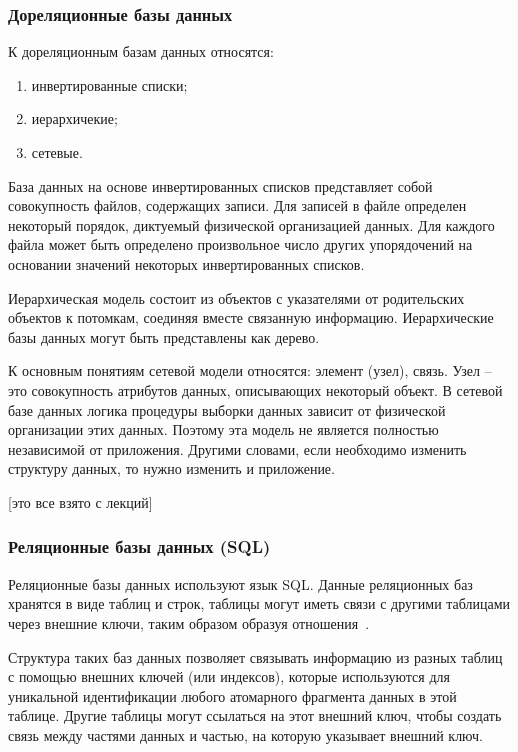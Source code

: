 \subsubsection{Дореляционные базы данных}

К дореляционным базам данных относятся:

\begin{enumerate}[label*=---]
	\item инвертированные списки;
	\item иерархичекие;
	\item сетевые.
\end{enumerate}

База данных на основе инвертированных списков представляет собой совокупность файлов, содержащих записи. Для записей в файле определен некоторый порядок, диктуемый физической организацией данных. Для каждого файла может быть определено произвольное число других упорядочений на основании значений некоторых инвертированных списков. 

Иерархическая модель  состоит из объектов с указателями от родительских объектов к потомкам, соединяя вместе связанную информацию. Иерархические базы данных могут быть представлены как дерево.

К основным понятиям сетевой модели относятся: элемент (узел), связь. Узел -- это совокупность атрибутов данных, описывающих некоторый объект. В сетевой базе данных логика процедуры выборки данных зависит от физической организации этих данных. Поэтому эта модель не является полностью независимой от приложения. Другими словами, если необходимо изменить структуру данных, то нужно изменить и приложение.


[это все взято с лекций]

\subsubsection{Реляционные базы данных (SQL)}

Реляционные базы данных используют язык SQL. Данные реляционных баз хранятся в виде таблиц и строк, таблицы могут иметь связи с другими таблицами через внешние ключи, таким образом образуя отношения~\cite{sql}. 

Структура таких баз данных позволяет связывать информацию из разных таблиц с помощью внешних ключей (или индексов), которые используются для уникальной идентификации любого атомарного фрагмента данных в этой таблице. Другие таблицы могут ссылаться на этот внешний ключ, чтобы создать связь между частями данных и частью, на которую указывает внешний ключ.

